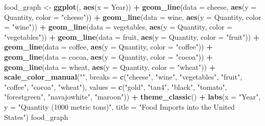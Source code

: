 \documentclass[]{article}
\newenvironment{Shaded}{\begin{snugshade}}{\end{snugshade}}
\newcommand{\KeywordTok}[1]{\textcolor[rgb]{0.13,0.29,0.53}{\textbf{#1}}}
\newcommand{\DataTypeTok}[1]{\textcolor[rgb]{0.13,0.29,0.53}{#1}}
\newcommand{\StringTok}[1]{\textcolor[rgb]{0.31,0.60,0.02}{#1}}
\newcommand{\OperatorTok}[1]{\textcolor[rgb]{0.81,0.36,0.00}{\textbf{#1}}}
\newcommand{\NormalTok}[1]{#1}
\begin{document}
\begin{Shaded}
\begin{Highlighting}[]
\NormalTok{food_graph <-}\StringTok{ }
\StringTok{  }\KeywordTok{ggplot}\NormalTok{(, }\KeywordTok{aes}\NormalTok{(}\DataTypeTok{x =}\NormalTok{ Year)) }\OperatorTok{+}
\StringTok{  }\KeywordTok{geom_line}\NormalTok{(}\DataTypeTok{data =}\NormalTok{ cheese, }\KeywordTok{aes}\NormalTok{(}\DataTypeTok{y =}\NormalTok{ Quantity, }\DataTypeTok{color =} \StringTok{"cheese"}\NormalTok{)) }\OperatorTok{+}
\StringTok{  }\KeywordTok{geom_line}\NormalTok{(}\DataTypeTok{data =}\NormalTok{ wine, }\KeywordTok{aes}\NormalTok{(}\DataTypeTok{y =}\NormalTok{ Quantity, }\DataTypeTok{color =} \StringTok{"wine"}\NormalTok{)) }\OperatorTok{+}
\StringTok{  }\KeywordTok{geom_line}\NormalTok{(}\DataTypeTok{data =}\NormalTok{ vegetables, }\KeywordTok{aes}\NormalTok{(}\DataTypeTok{y =}\NormalTok{ Quantity, }\DataTypeTok{color =} \StringTok{"vegetables"}\NormalTok{)) }\OperatorTok{+}
\StringTok{  }\KeywordTok{geom_line}\NormalTok{(}\DataTypeTok{data =}\NormalTok{ fruit, }\KeywordTok{aes}\NormalTok{(}\DataTypeTok{y =}\NormalTok{ Quantity, }\DataTypeTok{color =} \StringTok{"fruit"}\NormalTok{)) }\OperatorTok{+}
\StringTok{  }\KeywordTok{geom_line}\NormalTok{(}\DataTypeTok{data =}\NormalTok{ coffee, }\KeywordTok{aes}\NormalTok{(}\DataTypeTok{y =}\NormalTok{ Quantity, }\DataTypeTok{color =} \StringTok{"coffee"}\NormalTok{)) }\OperatorTok{+}
\StringTok{  }\KeywordTok{geom_line}\NormalTok{(}\DataTypeTok{data =}\NormalTok{ cocoa, }\KeywordTok{aes}\NormalTok{(}\DataTypeTok{y =}\NormalTok{ Quantity, }\DataTypeTok{color =} \StringTok{"cocoa"}\NormalTok{)) }\OperatorTok{+}
\StringTok{  }\KeywordTok{geom_line}\NormalTok{(}\DataTypeTok{data =}\NormalTok{ wheat, }\KeywordTok{aes}\NormalTok{(}\DataTypeTok{y =}\NormalTok{ Quantity, }\DataTypeTok{color =} \StringTok{"wheat"}\NormalTok{)) }\OperatorTok{+}
\StringTok{  }\KeywordTok{scale_color_manual}\NormalTok{(}\StringTok{""}\NormalTok{,}
                     \DataTypeTok{breaks =} \KeywordTok{c}\NormalTok{(}\StringTok{"cheese"}\NormalTok{, }\StringTok{"wine"}\NormalTok{, }\StringTok{"vegetables"}\NormalTok{, }\StringTok{"fruit"}\NormalTok{, }\StringTok{"coffee"}\NormalTok{, }\StringTok{"cocoa"}\NormalTok{, }\StringTok{"wheat"}\NormalTok{),}
                     \DataTypeTok{values =} \KeywordTok{c}\NormalTok{(}\StringTok{"gold"}\NormalTok{, }\StringTok{"tan4"}\NormalTok{, }\StringTok{"black"}\NormalTok{, }\StringTok{"tomato"}\NormalTok{, }\StringTok{"forestgreen"}\NormalTok{, }\StringTok{"navajowhite"}\NormalTok{, }\StringTok{"maroon"}\NormalTok{)) }\OperatorTok{+}
\StringTok{  }\KeywordTok{theme_classic}\NormalTok{() }\OperatorTok{+}
\StringTok{  }\KeywordTok{labs}\NormalTok{(}\DataTypeTok{x =} \StringTok{"Year"}\NormalTok{, }\DataTypeTok{y =} \StringTok{"Quantity (1000 metric tons)"}\NormalTok{, }\DataTypeTok{title =} \StringTok{"Food Imports into the United States"}\NormalTok{)}
\NormalTok{food_graph}
\end{Highlighting}
\end{Shaded}
\end{document}
